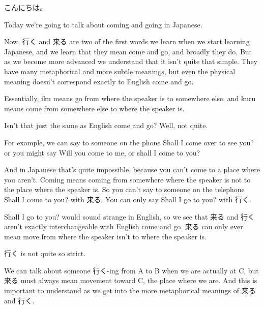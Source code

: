 \startsectionlevel[title={{\bf 65. Coming and Going: Deeper secrets of 行く and 来る、て行くand て来る (te-iku, te-kuru)}},reference={coming-and-going-deeper-secrets-of-行く-and-来るて行くand-て来る-te-iku-te-kuru}]

{}

こんにちは。

Today we're going to talk about coming and going in Japanese.

Now, 行く and 来る are two of the first words we learn when we start learning Japanese, and we learn that they mean come and go, and broadly they do. But as we become more advanced we understand that it isn't quite that simple. They have many metaphorical and more subtle meanings, but even the physical meaning doesn't correspond exactly to English come and go.

Essentially, iku means go from where the speaker is to somewhere else, and kuru means come from somewhere else to where the speaker is.

\startblockquote
{}
\stopblockquote

Isn't that just the same as English come and go? Well, not quite.

For example, we can say to someone on the phone Shall I come over to see you? or you might say Will you come to me, or shall I come to you?

{}

And in Japanese that's quite impossible, because you can't come to a place where you aren't. Coming means coming from somewhere where the speaker is not to the place where the speaker is. So you can't say to someone on the telephone Shall I come to you? with 来る. You can only say Shall I go to you? with 行く.

Shall I go to you? would sound strange in English, so we see that 来る and 行く aren't exactly interchangeable with English come and go. 来る can only ever mean move from where the speaker isn't to where the speaker is.

行く is not quite so strict.

{}

We can talk about someone 行く-ing from A to B when we are actually at C, but 来る must always mean movement toward C, the place where we are. And this is important to understand as we get into the more metaphorical meanings of 来る and 行く.

